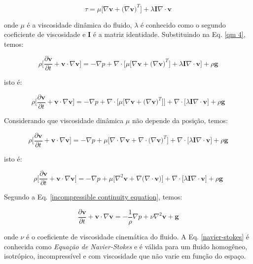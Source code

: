 \begin{equation}
 \tau = \mu \big[ \nabla \textbf{v} + \big( \nabla \textbf{v} \big)^{T} \big]
      + \lambda \textbf{I} \nabla \cdot \textbf{v}
\end{equation}

\medskip
\noindent
onde $\mu$ é a viscosidade dinâmica do fluido,
$\lambda$ é conhecido como o segundo coeficiente
de viscosidade e \textbf{I} é a matriz identidade.
Substituindo na Eq. \ref{qm 4}, temos:

\begin{equation} 
 \rho \Bigg[ \frac{\partial \textbf{v}}{\partial t} + \textbf{v} \cdot \nabla \textbf{v} \Bigg]
 =
 -
 \nabla p
 +
 \nabla \cdot \big[ 
 \mu \big[ \nabla \textbf{v} + \big( \nabla \textbf{v} \big)^{T} \big]
 + \lambda \textbf{I} \nabla \cdot \textbf{v}
 \big]
 +
 \rho \textbf{g}
\end{equation}


\medskip
\noindent
isto é:

\begin{equation} 
 \rho \Bigg[ \frac{\partial \textbf{v}}{\partial t} + \textbf{v} \cdot \nabla \textbf{v} \Bigg]
 =
 -
 \nabla p
 +
 \nabla \cdot \big[ \mu \big[ \nabla \textbf{v} + \big( \nabla \textbf{v} \big)^{T} \big] \big]
 + 
 \nabla \cdot \big[ \lambda \textbf{I} \nabla \cdot \textbf{v} \big]
 +
 \rho \textbf{g}
\end{equation}


\medskip
\noindent
Considerando que viscosidade dinâmica $\mu$ não depende da posição, temos:

\begin{equation} 
 \rho \Bigg[ \frac{\partial \textbf{v}}{\partial t} + \textbf{v} \cdot \nabla \textbf{v} \Bigg]
 =
 -
 \nabla p
 +
 \mu \big[ \nabla \cdot \nabla \textbf{v} + \nabla \cdot \big( \nabla \textbf{v} \big)^{T} \big]
 +
 \nabla \cdot \big[ \lambda \textbf{I} \nabla \cdot \textbf{v} \big]
 +
 \rho \textbf{g}
\end{equation}

\medskip
\noindent
isto é:

\begin{equation} 
 \rho \Bigg[ \frac{\partial \textbf{v}}{\partial t} + \textbf{v} \cdot \nabla \textbf{v} \Bigg]
 =
 -
 \nabla p
 +
 \mu \big[ \nabla^{2} \textbf{v} + \nabla \big( \nabla \cdot \textbf{v} \big) \big]
 +
 \nabla \cdot \big[ \lambda \textbf{I} \nabla \cdot \textbf{v} \big]
 +
 \rho \textbf{g}
\end{equation}

\medskip
\noindent
Segundo a Eq. \ref{incompressible continuity equation}, temos:

\begin{equation} \label{navier-stokes}
 \frac{\partial \textbf{v}}{\partial t} + \textbf{v} \cdot \nabla \textbf{v}
 =
 -
 \frac{1}{\rho} \nabla p
 +
 \nu \nabla^{2} \textbf{v}
 +
 \textbf{g}
\end{equation}

\medskip
\noindent
onde $\nu$ é o coeficiente de viscosidade
cinemática do fluido. A Eq. \ref{navier-stokes} é conhecida como 
\textit{Equação de Navier-Stokes} e é válida
para um fluido homogêneo, isotrópico, incompressível
e com viscosidade que não varie em função do espaço.

\newpage
